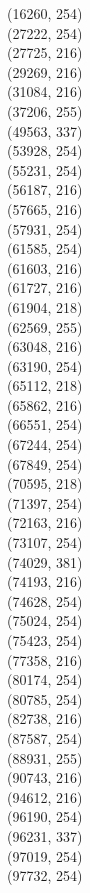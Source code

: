 (16260, 254)\\
(27222, 254)\\
(27725, 216)\\
(29269, 216)\\
(31084, 216)\\
(37206, 255)\\
(49563, 337)\\
(53928, 254)\\
(55231, 254)\\
(56187, 216)\\
(57665, 216)\\
(57931, 254)\\
(61585, 254)\\
(61603, 216)\\
(61727, 216)\\
(61904, 218)\\
(62569, 255)\\
(63048, 216)\\
(63190, 254)\\
(65112, 218)\\
(65862, 216)\\
(66551, 254)\\
(67244, 254)\\
(67849, 254)\\
(70595, 218)\\
(71397, 254)\\
(72163, 216)\\
(73107, 254)\\
(74029, 381)\\
(74193, 216)\\
(74628, 254)\\
(75024, 254)\\
(75423, 254)\\
(77358, 216)\\
(80174, 254)\\
(80785, 254)\\
(82738, 216)\\
(87587, 254)\\
(88931, 255)\\
(90743, 216)\\
(94612, 216)\\
(96190, 254)\\
(96231, 337)\\
(97019, 254)\\
(97732, 254)\\
